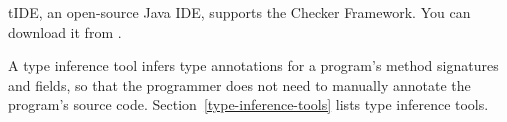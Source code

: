 
\begin{sloppypar}
tIDE, an open-source Java IDE, supports the Checker Framework.
You can download it from .
\end{sloppypar}



A type inference tool infers type annotations for a program's method
signatures and fields, so that the programmer does not need to manually
annotate the program's source code.  Section~\ref{type-inference-tools}
lists type inference tools.



